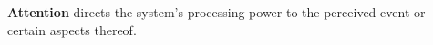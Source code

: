



\begin{defn}\label{def:attention}
\hypertarget{def:attention}{}\textbf{Attention} directs the system's  processing power to the perceived event or certain aspects thereof.
\end{defn}


